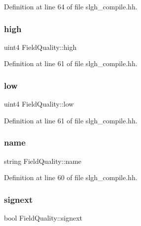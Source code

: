 Definition at line 64 of file slgh\+\_\+compile.\+hh.

\mbox{\label{struct_field_quality_a3113058a16294bbb876a42c19fc43363}} 
\subsubsection{\texorpdfstring{high}{high}}
{\footnotesize\ttfamily uint4 Field\+Quality\+::high}



Definition at line 61 of file slgh\+\_\+compile.\+hh.

\mbox{\label{struct_field_quality_a04c4b1c557d5cdb7665d312eb40e6de6}} 
\subsubsection{\texorpdfstring{low}{low}}
{\footnotesize\ttfamily uint4 Field\+Quality\+::low}



Definition at line 61 of file slgh\+\_\+compile.\+hh.

\mbox{\label{struct_field_quality_aae4142548f31eee7c90a60aa77136333}} 
\subsubsection{\texorpdfstring{name}{name}}
{\footnotesize\ttfamily string Field\+Quality\+::name}



Definition at line 60 of file slgh\+\_\+compile.\+hh.

\mbox{\label{struct_field_quality_ae530ddb1a99aee0c1f68bc99704a8ec2}} 
\subsubsection{\texorpdfstring{signext}{signext}}
{\footnotesize\ttfamily bool Field\+Quality\+::signext}



